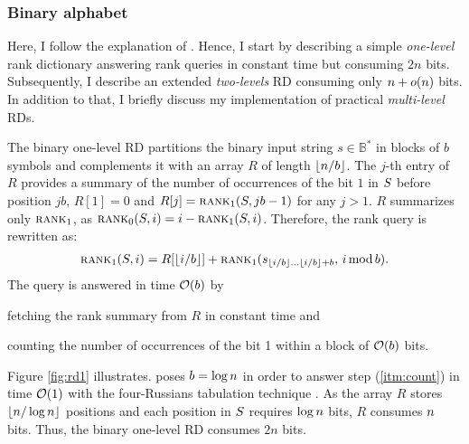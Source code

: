 \subsubsection{Binary alphabet}
\label{sec:index:rd:binary}

Here, I follow the explanation of \citep{Navarro2007}.
Hence, I start by describing a simple \emph{one-level} rank dictionary answering rank queries in constant time but consuming $2n$ bits.
Subsequently, I describe an extended \emph{two-levels} RD consuming only $n + o(n)$ bits.
In addition to that, I briefly discuss my implementation of practical \emph{multi-level} RDs.

The binary one-level RD partitions the binary input string $s \in \mathbb{B}^*$ in blocks of $b$ symbols and
complements it with an array $R$ of length $\left \lfloor n/b \right \rfloor$.
The $j$-th entry of $R$ provides a summary of the number of occurrences of the bit $1$ in $S$ before position $j b$, \ie $R[1] = 0$ and $R[j] = \textsc{rank}_1(S, j b - 1)$ for any $j > 1$.
$R$ summarizes only $\textsc{rank}_1$, as $\textsc{rank}_0(S, i) = i - \textsc{rank}_1(S, i)$.
Therefore, the rank query is rewritten as:
\begin{eqnarray}
\rank_1(\String,i) = R[\xfloor{i/b}] + \rank_1(s_{\xfloor{i/b} \dots \xfloor{i/b}+b}, \, i \imod{b}).
\end{eqnarray}
The query is answered in time $\mathcal{O}(b)$ by 
\begin{inparaenum}[(i)]
\item \label{itm:fetch} fetching the rank summary from $R$ in constant time and
\item \label{itm:count} counting the number of occurrences of the bit 1 within a block of $\mathcal{O}(b)$ bits.
\end{inparaenum}
Figure \ref{fig:rd1} illustrates.
\citeauthor{Jacobson1989} poses $b=\log{n}$ in order to answer step (\ref{itm:count}) in time $\mathcal{O}(1)$ with the four-Russians tabulation technique \citep{Arlazarov1970}.
As the array $R$ stores $\left \lfloor n/\log{n} \right \rfloor$ positions and each position in $S$ requires $\log{n}$ bits, $R$ consumes $n$ bits.
Thus, the binary one-level RD consumes $2n$ bits.


